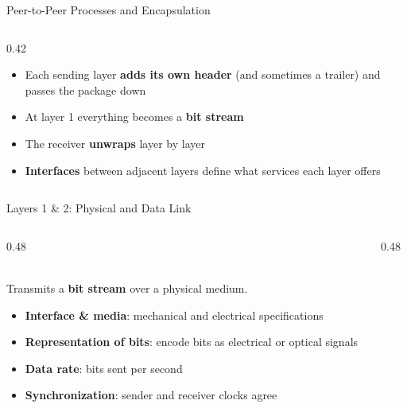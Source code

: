 \documentclass[aspectratio=169,11pt,xcolor={table}]{beamer}
\begin{document}
\begin{frame}{Peer-to-Peer Processes and Encapsulation}
\begin{columns}[c]
\begin{column}{0.42\textwidth}
\begin{itemize}
        \item Each sending layer \textbf{adds its own header} (and sometimes a trailer) and passes the package down
        \item At layer 1 everything becomes a \textbf{bit stream}
        \item The receiver \textbf{unwraps} layer by layer
        \item \textbf{Interfaces} between adjacent layers define what services each layer offers
      \end{itemize}
    \end{column}
  \end{columns}
\end{frame}

\begin{frame}{Layers 1 \& 2: Physical and Data Link}
  \begin{columns}[T]
    \begin{column}{0.48\textwidth}
      \\[1mm]
      {\small Transmits a \textbf{bit stream} over a physical medium.}
      \begin{itemize}\scriptsize\setlength{\itemsep}{2pt}
        \item \textbf{Interface \& media}: mechanical and electrical specifications
        \item \textbf{Representation of bits}: encode bits as electrical or optical signals
        \item \textbf{Data rate}: bits sent per second
        \item \textbf{Synchronization}: sender and receiver clocks agree
      \end{itemize}
      \centering
    \end{column}
    \begin{column}{0.48\textwidth}
      \begin{tikzpicture}

\end{tikzpicture}
\end{column}
\end{columns}
\end{frame}
\end{document}
